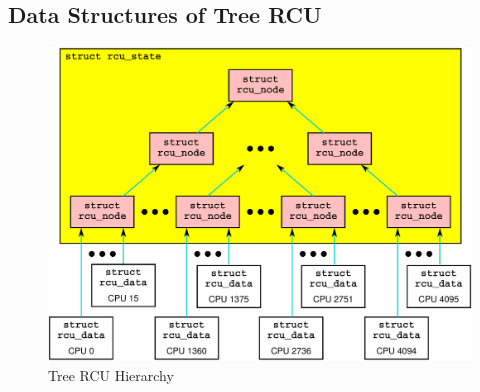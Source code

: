 \subsection{Data Structures of Tree RCU} \label{sec:data_structure}

\begin{figure}[tbp]
\centering
\includegraphics[scale=0.2]{tree_rcu_hierarchy.pdf}
\caption{Tree RCU Hierarchy}
\label{fig:tree_rcu_hierarchy}
\end{figure}

